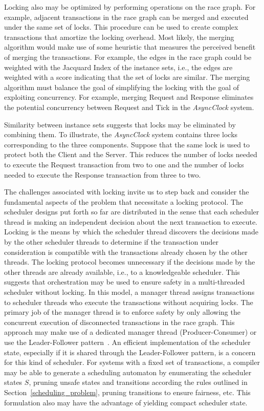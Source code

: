 Locking also may be optimized by performing operations on the race graph.
For example, adjacent transactions in the race graph can be merged and executed under the same set of locks.
This procedure can be used to create complex transactions that amortize the locking overhead.
Most likely, the merging algorithm would make use of some heuristic that measures the perceived benefit of merging the transactions.
For example, the edges in the race graph could be weighted with the Jacquard Index of the instance sets, i.e., the edges are weighted with a score indicating that the set of locks are similar.
The merging algorithm must balance the goal of simplifying the locking with the goal of exploiting concurrency.
For example, merging Request and Response eliminates the potential concurrency between Request and Tick in the \emph{AsyncClock} system.

Similarity between instance sets suggests that locks may be eliminated by combining them.
To illustrate, the \emph{AsyncClock} system contains three locks corresponding to the three components.
Suppose that the same lock is used to protect both the Client and the Server.
This reduces the number of locks needed to execute the Request transaction from two to one and the number of locks needed to execute the Response transaction from three to two.

The challenges associated with locking invite us to step back and consider the fundamental aspects of the problem that necessitate a locking protocol.
The scheduler designs put forth so far are distributed in the sense that each scheduler thread is making an independent decision about the next transaction to execute.
Locking is the means by which the scheduler thread discovers the decisions made by the other scheduler threads to determine if the transaction under consideration is compatible with the transactions already chosen by the other threads.
The locking protocol becomes unnecessary if the decisions made by the other threads are already available, i.e., to a knowledgeable scheduler.
This suggests that orchestration may be used to ensure safety in a multi-threaded scheduler without locking.
In this model, a manager thread assigns transactions to scheduler threads who execute the transactions without acquiring locks.
The primary job of the manager thread is to enforce safety by only allowing the concurrent execution of disconnected transactions in the race graph.
This approach may make use of a dedicated manager thread (Producer-Consumer) or use the Leader-Follower pattern~\cite{schmidt2000pattern}.
An efficient implementation of the scheduler state, especially if it is shared through the Leader-Follower pattern, is a concern for this kind of scheduler.
For systems with a fixed set of transactions, a compiler may be able to generate a scheduling automaton by enumerating the scheduler states $S$, pruning unsafe states and transitions according the rules outlined in Section~\ref{scheduling_problem}, pruning transitions to ensure fairness, etc.
This formulation also may have the advantage of yielding compact scheduler state.

